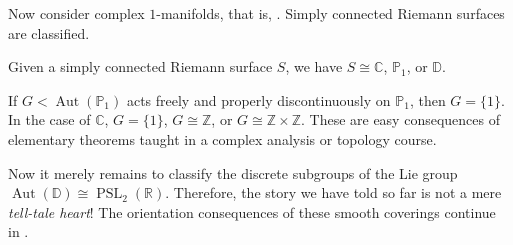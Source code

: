 \documentclass[11pt,a4paper]{article}
\begin{document}
Now consider complex $1$-manifolds, that is, . Simply
connected Riemann surfaces are classified.

\setcounter{theorem}{4}\begin{theorem}\label{thm:uniformisation}
Given a simply connected Riemann surface $S$, we have
$S\cong\mathbb C$, $\mathbb P_1$, or $\mathbb D$.
\end{theorem}

If $G<\operatorname{Aut}(\mathbb P_1)$ acts freely and properly discontinuously on
$\mathbb P_1$, then $G=\{1\}$. In the case of $\mathbb C$,
$G=\{1\}$, $G\cong\mathbb Z$, or $G\cong\mathbb Z\times\mathbb Z$. These are easy
consequences of elementary theorems taught in a complex analysis or
topology course.

Now it merely remains to classify the discrete subgroups of the Lie
group $\operatorname{Aut}(\mathbb D)\cong\operatorname{PSL}_2(\mathbb R)$.
Therefore, the story we have told so far is not a mere \emph{tell-tale heart}! The orientation consequences of these smooth coverings continue in .

\end{document}
